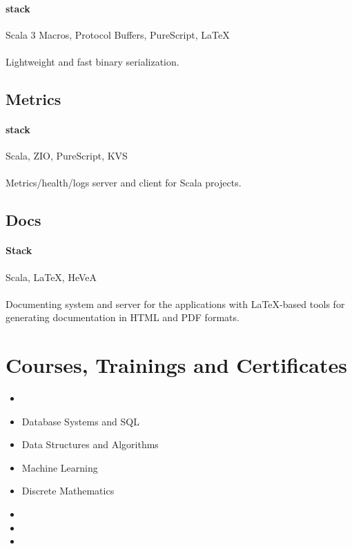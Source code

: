 \paragraph{stack}{Scala 3 Macros, Protocol Buffers, PureScript, LaTeX}
\paragraph{}
Lightweight and fast binary serialization.

\subsection{Metrics}
\paragraph{stack} Scala, ZIO, PureScript, KVS
\paragraph{}
Metrics/health/logs server and client for Scala projects.

\subsection{Docs}
\paragraph{Stack} Scala, LaTeX, HeVeA
\paragraph{}
Documenting system and server for the applications with LaTeX-based tools for generating documentation in HTML and PDF formats.

\section{Courses, Trainings and Certificates}
\begin{itemize}
  \item {}
  \item Database Systems and SQL
  \item Data Structures and Algorithms
  \item Machine Learning
  \item Discrete Mathematics
  \item {}
  \item {}
  \item {}
\end{itemize}

